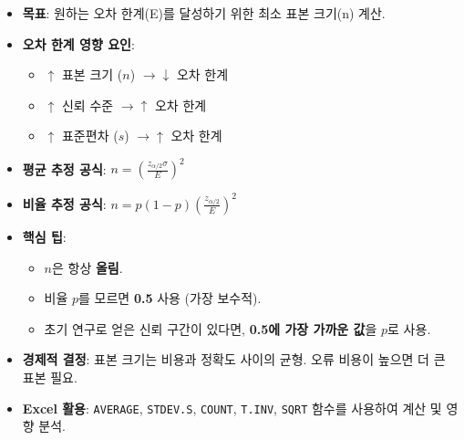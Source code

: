 \documentclass[11pt,a4paper]{article}
\theoremstyle{definition}
\begin{document}
\begin{enumerate}
\begin{enumerate}
\begin{tcolorbox}[colback=boxblue!10!white, colframe=boxblue!75!black, title=\textbf{표본 크기 결정 핵심 요약}]
\begin{itemize}
    \item \textbf{목표}: 원하는 오차 한계(E)를 달성하기 위한 최소 표본 크기(n) 계산.
    \item \textbf{오차 한계 영향 요인}:
    \begin{itemize}
        \item \(\uparrow\) 표본 크기 (\(n\)) \(\rightarrow \downarrow\) 오차 한계
        \item \(\uparrow\) 신뢰 수준 \(\rightarrow \uparrow\) 오차 한계
        \item \(\uparrow\) 표준편차 (\(s\)) \(\rightarrow \uparrow\) 오차 한계
    \end{itemize}
    \item \textbf{평균 추정 공식}: \(n = \left( \frac{z_{\alpha/2} \sigma}{E} \right)^2\)
    \item \textbf{비율 추정 공식}: \(n = p(1-p) \left( \frac{z_{\alpha/2}}{E} \right)^2\)
    \item \textbf{핵심 팁}:
    \begin{itemize}
        \item \(n\)은 항상 \textbf{올림}.
        \item 비율 \(p\)를 모르면 \textbf{0.5} 사용 (가장 보수적).
        \item 초기 연구로 얻은 신뢰 구간이 있다면, \textbf{0.5에 가장 가까운 값}을 \(p\)로 사용.
    \end{itemize}
    \item \textbf{경제적 결정}: 표본 크기는 비용과 정확도 사이의 균형. 오류 비용이 높으면 더 큰 표본 필요.
    \item \textbf{Excel 활용}: \texttt{AVERAGE}, \texttt{STDEV.S}, \texttt{COUNT}, \texttt{T.INV}, \texttt{SQRT} 함수를 사용하여 계산 및 영향 분석.
\end{itemize}
\end{tcolorbox}


\end{enumerate}  %
\end{enumerate}  %
\end{document}
